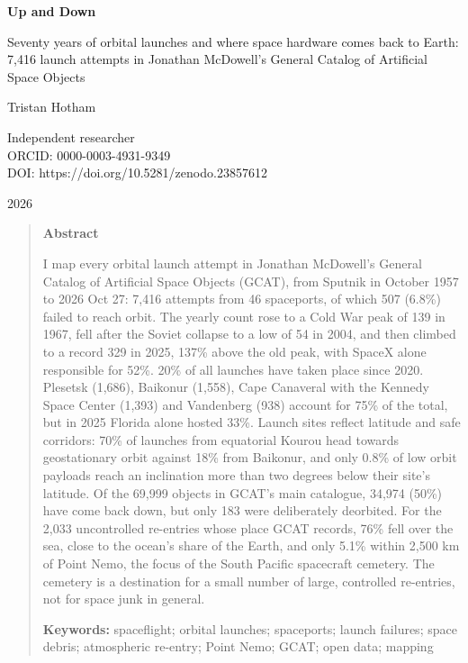 \documentclass[11pt,a4paper]{article}
\begin{document}
\begin{center}
{\Large\bfseries Up and Down\par}
\vspace{0.4em}
{\large Seventy years of orbital launches and where space hardware comes back to Earth:\\7,416 launch attempts in Jonathan McDowell's General Catalog of Artificial Space Objects\par}
\vspace{1.2em}
{\large Tristan Hotham\par}
\vspace{0.3em}
{\small Independent researcher\\
ORCID: 0000-0003-4931-9349\\
DOI: https://doi.org/10.5281/zenodo.23857612\par}
\vspace{0.8em}
2026
\end{center}

\begin{quote}
\small
\begin{center}\textbf{Abstract}\end{center}
I map every orbital launch attempt in Jonathan McDowell's General Catalog of Artificial Space Objects (GCAT), from Sputnik in October 1957 to 2026 Oct 27: 7,416 attempts from 46 spaceports, of which 507 (6.8\%) failed to reach orbit. The yearly count rose to a Cold War peak of 139 in 1967, fell after the Soviet collapse to a low of 54 in 2004, and then climbed to a record 329 in 2025, 137\% above the old peak, with SpaceX alone responsible for 52\%. 20\% of all launches have taken place since 2020. Plesetsk (1,686), Baikonur (1,558), Cape Canaveral with the Kennedy Space Center (1,393) and Vandenberg (938) account for 75\% of the total, but in 2025 Florida alone hosted 33\%. Launch sites reflect latitude and safe corridors: 70\% of launches from equatorial Kourou head towards geostationary orbit against 18\% from Baikonur, and only 0.8\% of low orbit payloads reach an inclination more than two degrees below their site's latitude. Of the 69,999 objects in GCAT's main catalogue, 34,974 (50\%) have come back down, but only 183 were deliberately deorbited. For the 2,033 uncontrolled re-entries whose place GCAT records, 76\% fell over the sea, close to the ocean's share of the Earth, and only 5.1\% within 2,500 km of Point Nemo, the focus of the South Pacific spacecraft cemetery. The cemetery is a destination for a small number of large, controlled re-entries, not for space junk in general.

\textbf{Keywords:} spaceflight; orbital launches; spaceports; launch failures; space debris; atmospheric re-entry; Point Nemo; GCAT; open data; mapping
\end{quote}
\end{document}
